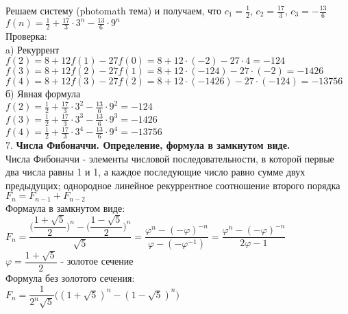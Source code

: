\documentclass[12pt]{article}
\begin{document}
Решаем систему (photomath тема) и получаем, что $c_1 = \frac{1}{2}$, $c_2 = \frac{17}{3}$, $c_3 = -\frac{13}{6}$\\
$f(n) = \frac{1}{2} + \frac{17}{3} \cdot 3^n - \frac{13}{6} \cdot 9^n$\\
Проверка:\\
a) Рекуррент\\
$f(2) = 8 + 12f(1) - 27f(0) = 8 + 12 \cdot (-2) - 27 \cdot 4 = -124$\\
$f(3) = 8 + 12f(2) - 27f(1) = 8 + 12 \cdot (-124) - 27 \cdot (-2) = -1426$\\
$f(4) = 8 + 12f(3) - 27f(2) = 8 + 12 \cdot (-1426) - 27 \cdot (-124) = -13756$\\
б) Явная формула\\
$f(2) = \frac{1}{2} + \frac{17}{3} \cdot 3^2 - \frac{13}{6} \cdot 9^2 = -124$\\
$f(3) = \frac{1}{2} + \frac{17}{3} \cdot 3^3 - \frac{13}{6} \cdot 9^3 = -1426$\\
$f(4) = \frac{1}{2} + \frac{17}{3} \cdot 3^4 - \frac{13}{6} \cdot 9^4 = -13756$\\


7. \textbf{Числа Фибоначчи. Определение, формула в замкнутом виде.}\\
Числа Фибоначчи - элементы числовой последовательности, в которой первые два числа равны 1 и 1, а каждое последующие число равно сумме двух предыдущих; однородное линейное рекуррентное соотношение второго порядка\\
$F_n = F_{n-1} + F_{n-2}$\\
Формаула в замкнутом виде:\\
$F_n = \dfrac{\Big ( \dfrac{1 + \sqrt{5}}{2} \Big )^n - \Big ( \dfrac{1 - \sqrt{5}}{2} \Big )^n}{\sqrt{5}} = \dfrac{\varphi^n - (-\varphi)^{-n}}{\varphi - (-\varphi^{-1})} = \dfrac{\varphi^n - (-\varphi)^{-n}}{2\varphi - 1}$\\
$\varphi = \dfrac{1 + \sqrt{5}}{2}$ - золотое сечение\\
Формула без золотого сечения:\\
$F_n = \dfrac{1}{2^n\sqrt{5}} \big ( (1 + \sqrt{5})^n - (1 - \sqrt{5})^n \big )$
\end{document}

